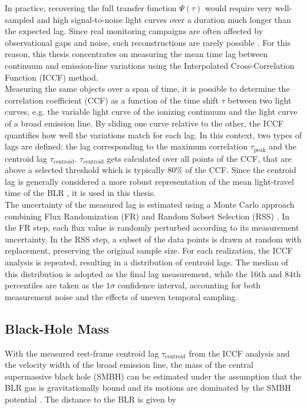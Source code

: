 In practice, recovering the full transfer function $\Psi\left(\tau\right)$ would require very well-sampled and high signal-to-noise light curves over a duration much longer than the expected lag. Since real monitoring campaigns are often affected by observational gaps and noise, such reconstructions are rarely possible \parencite{horne2004observational,peterson1993}. For this reason, this thesis concentrates on measuring the mean time lag between continuum and emission-line variations using the Interpolated Cross-Correlation Function (ICCF) method.\\
Measuring the same objects over a span of time, it is possible to determine the correlation coefficient (CCF)  as a function of the time shift $\tau$ between two light curves, e.g. the variable light curve of the ionizing continuum and the light curve of a broad emission line. By sliding one curve relative to the other, the ICCF quantifies how well the variations match for each lag.  In this context, two types of lags are defined: the lag corresponding to the maximum correlation $\tau_{\mathrm{peak}}$ and the centroid lag $\tau_{\mathrm{centroid}}$. $\tau_{\mathrm{centroid}}$ gets calculated over all points of the CCF, that are above a selected threshold which is typically $80\%$ of the CCF. Since the centroid lag is generally considered a more robust representation of the mean light-travel time of the BLR \parencite{peterson2004}, it is used in this thesis.\\
The uncertainty of the measured lag is estimated using a Monte Carlo approach combining Flux Randomization (FR) and Random Subset Selection (RSS) \parencite{peterson1998,peterson2004}. In the FR step, each flux value is randomly perturbed according to its measurement uncertainty. In the RSS step, a subset of the data points is drawn at random with replacement, preserving the original sample size. For each realization, the ICCF analysis is repeated, resulting in a distribution of centroid lags. The median of this distribution is adopted as the final lag measurement, while the 16th and 84th percentiles are taken as the $1 \sigma$ confidence interval, accounting for both measurement noise and the effects of uneven temporal sampling.


\subsection{Black-Hole Mass}
\label{subsec:rm_bh_mass}

With the measured rest-frame centroid lag $\tau_{\mathrm{centroid}}$ from the ICCF analysis and the velocity width of the broad emission line, the mass of the central supermassive black hole (SMBH) can be estimated under the assumption that the BLR gas is gravitationally bound and its motions are dominated by the SMBH potential \parencite{peterson2004}. The distance to the BLR is given by

